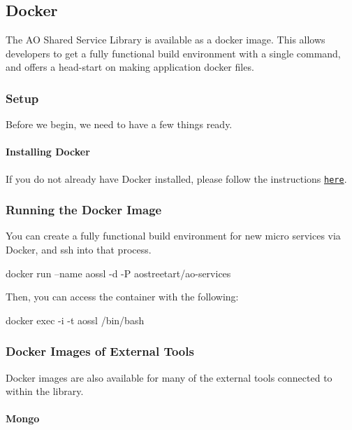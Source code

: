 \subsection*{Docker}

The AO Shared Service Library is available as a docker image. This allows developers to get a fully functional build environment with a single command, and offers a head-\/start on making application docker files.

\subsubsection*{Setup}

Before we begin, we need to have a few things ready.

\paragraph*{Installing Docker}

If you do not already have Docker installed, please follow the instructions \href{https://docs.docker.com/engine/installation}{\tt here}.

\subsubsection*{Running the Docker Image}

You can create a fully functional build environment for new micro services via Docker, and ssh into that process. \begin{DoxyVerb}docker run --name aossl -d -P aostreetart/ao-services
\end{DoxyVerb}


Then, you can access the container with the following\+: \begin{DoxyVerb}docker exec -i -t aossl /bin/bash
\end{DoxyVerb}


\subsubsection*{Docker Images of External Tools}

Docker images are also available for many of the external tools connected to within the library.

\paragraph*{Mongo}

